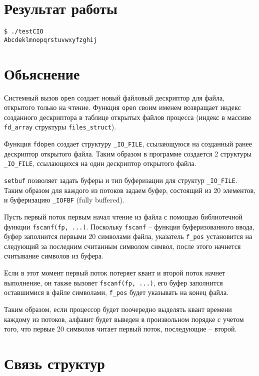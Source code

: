 \section{Результат работы}

\begin{lstlisting}
$ ./testCIO
Abcdeklmnopqrstuvwxyfzghij        
\end{lstlisting}

\section{Обьяснение}

Системный вызов \texttt{open} создает новый файловый дескриптор для файла, открытого только на чтение. Функция \texttt{open} своим именем возвращает индекс созданного дескриптора в таблице открытых файлов процесса (индекс в массиве \texttt{fd\_array} структуры \texttt{files\_struct}).

Функция \texttt{fdopen} создает структуру \texttt{\_IO\_FILE}, ссылающуюся на созданный ранее дескриптор открытого файла. Таким образом в программе создается 2 структуры \texttt{\_IO\_FILE}, ссылающихся на один дескриптор открытого файла.

\texttt{setbuf} позволяет задать буферы и тип буферизации для структур \texttt{\_IO\_FILE}. Таким образом для каждого из потоков задаем буфер, состоящий из 20 элементов, и буферизацию \texttt{\_IOFBF} (fully buffered).

Пусть первый поток первым начал чтение из файла с помощью библиотечной функции \texttt{fscanf(fp, ...)}. Поскольку \texttt{fscanf} -- функция буферизованного ввода, буфер заполнится первыми 20 символами файла, указатель \texttt{f\_pos} установится на следующий за последним считанным символом символ, после этого начнется считывание символов из буфера.

Если в этот момент первый поток потеряет квант и второй поток начнет выполнение, он также вызовет \texttt{fscanf(fp, ...)}, его буфер заполнится оставшимися в файле символами, \texttt{f\_pos} будет указывать на конец файла.

Таким образом, если процессор будет поочередно выделять квант времени каждому из потоков, алфавит будет выведен в произвольном порядке с учетом того, что первые 20 символов читает первый поток, последующие -- второй.

\clearpage

\section*{Связь структур}

